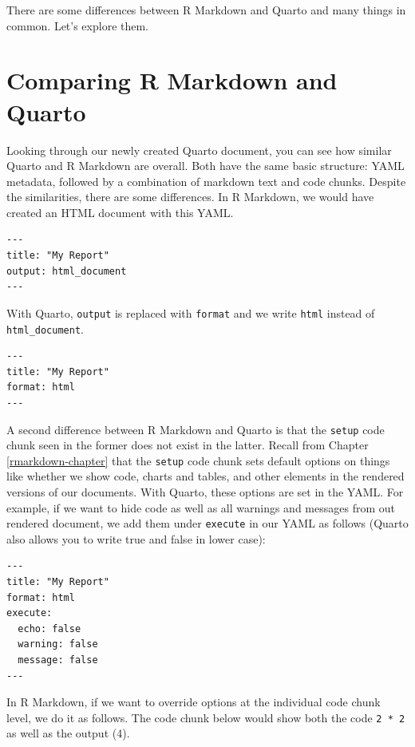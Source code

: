 \documentclass[
]{book}
\begin{document}
There are some differences between R Markdown and Quarto and many things in common. Let's explore them.

\hypertarget{comparing-r-markdown-and-quarto}{%
\section*{Comparing R Markdown and Quarto}\label{comparing-r-markdown-and-quarto}}

Looking through our newly created Quarto document, you can see how similar Quarto and R Markdown are overall. Both have the same basic structure: YAML metadata, followed by a combination of markdown text and code chunks. Despite the similarities, there are some differences. In R Markdown, we would have created an HTML document with this YAML.

\begin{verbatim}
---
title: "My Report"
output: html_document
---
\end{verbatim}

With Quarto, \texttt{output} is replaced with \texttt{format} and we write \texttt{html} instead of \texttt{html\_document}.

\begin{verbatim}
---
title: "My Report"
format: html
---
\end{verbatim}

A second difference between R Markdown and Quarto is that the \texttt{setup} code chunk seen in the former does not exist in the latter. Recall from Chapter \ref{rmarkdown-chapter} that the \texttt{setup} code chunk sets default options on things like whether we show code, charts and tables, and other elements in the rendered versions of our documents. With Quarto, these options are set in the YAML. For example, if we want to hide code as well as all warnings and messages from out rendered document, we add them under \texttt{execute} in our YAML as follows (Quarto also allows you to write true and false in lower case):

\begin{verbatim}
---
title: "My Report"
format: html
execute:
  echo: false
  warning: false
  message: false
---
\end{verbatim}

In R Markdown, if we want to override options at the individual code chunk level, we do it as follows. The code chunk below would show both the code \texttt{2\ *\ 2} as well as the output (4).
\end{document}
